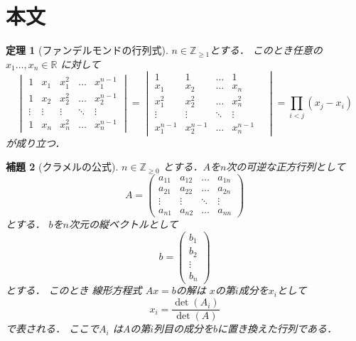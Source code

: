 \documentclass[leqno, a4paper, 12pt]{jsarticle}
\newtheorem{thm}{定理}
\newtheorem{lem}[thm]{補題}
\newcommand{\zz}{\mathbb{Z}}
\newcommand{\rr}{\mathbb{R}}
\begin{document}
\section{本文}


\begin{thm}[ファンデルモンドの行列式]
$n\in \zz_{\ge 1}$とする．
このとき任意の$x_{1}\dots, x_{n}\in \rr$
に対して
\[
\begin{vmatrix}
1 & x_{1} & x_{1}^{2} & \dots & x_{1}^{n-1}\\
1 & x_{2} & x_{2}^{2} & \dots & x_{2}^{n-1}\\
\vdots & \vdots  &  \vdots & \ddots &\vdots\\
1 & x_{n} & x_{n}^{2} & \dots & x_{n}^{n-1}
\end{vmatrix}
=
\begin{vmatrix}
1 & 1 &  \dots & 1\\
x_{1} & x_{2} &  \dots & x_{n}\\
x_{1}^{2} & x_{2}^{2} &  \dots & x_{n}^{2}\\
\vdots & \vdots  &  \ddots & \vdots &\\
x_{1}^{n-1} & x_{2}^{n-1} &  \dots & x_{n}^{n-1}
\end{vmatrix}
=\prod_{i<j}(x_{j}-x_{i})
\]
が成り立つ．
\end{thm}

\begin{lem}[クラメルの公式]
$n\in \zz_{\ge 0}$
とする．$A$を$n$次の可逆な正方行列として
\[
A=
\begin{pmatrix}
a_{11} & a_{12} &  \dots & a_{1n}\\
a_{21} & a_{22} &  \dots & a_{2n}\\
\vdots & \vdots  &   \ddots &\vdots\\
a_{n1} & a_{n2} &  \dots & a_{nn}
\end{pmatrix}
\]
とする．
$b$を$n$次元の縦ベクトルとして
\[
b=
\begin{pmatrix}
b_{1}\\
b_{2}\\
\vdots\\
b_{n}
\end{pmatrix}
\]
とする．
このとき
線形方程式
$Ax=b$の解は
$x$の第$i$成分を$x_{i}$として
\[
x_{i}=\frac{\det(A_{i})}{\det(A)}
\]
で表される．
ここで$A_{i}$
は$A$の第$i$列目の成分を$b$に置き換えた行列である．
\end{lem}
\end{document}
